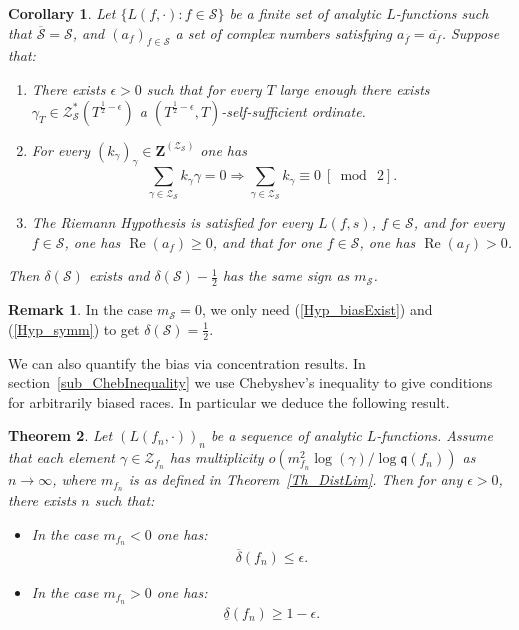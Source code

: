 \documentclass[a4paper,10pt]{amsart}
\theoremstyle{plain}
\newtheorem{theo}{Theorem}[section]
\newtheorem{cor}[theo]{Corollary}
\theoremstyle{definition}
\newtheorem{Rk}{Remark}
\begin{document}
\begin{cor}\label{Cor_mean_bias}
Let $\lbrace L(f,\cdot) : f\in\mathcal{S} \rbrace$ be a finite set of analytic $L$-functions such that $\overline{\mathcal{S}}=\mathcal{S}$, 
and $(a_{f})_{f\in \mathcal{S}}$ a set of complex numbers satisfying $a_{\overline{f}}= \overline{a_{f}}$.
Suppose that:
\begin{enumerate}
\item\label{Hyp_biasExist} There exists $\epsilon>0$ such that for every $T$ large enough there exists $\gamma_{T}\in \mathcal{Z}_{\mathcal{S}}^{*}(T^{\frac{1}{2} - \epsilon})$ a $(T^{\frac{1}{2} - \epsilon},T)$-self-sufficient ordinate.
\item\label{Hyp_symm} For every $(k_{\gamma})_{\gamma} \in \mathbf{Z}^{(\mathcal{Z}_{\mathcal{S}})}$ one has
$$ \sum_{\gamma \in \mathcal{Z}_{\mathcal{S}}}k_{\gamma}\gamma =0 \Rightarrow \sum_{\gamma \in \mathcal{Z}_{\mathcal{S}}}k_{\gamma}\equiv 0\ [\bmod\ 2].$$
\item\label{Hyp_supp} The Riemann Hypothesis is satisfied for every $L(f,s)$, $f\in\mathcal{S}$,
and for every $f\in \mathcal{S}$, one has $\operatorname{Re}(a_{f})\geq 0$, and that for one $f\in\mathcal{S}$, one has $\operatorname{Re}(a_{f})> 0$.
\end{enumerate}
Then $\delta(\mathcal{S})$ exists
and $\delta(\mathcal{S}) - \frac{1}{2}$ has the same sign as $m_{\mathcal{S}}$. 
\end{cor}

\begin{Rk}
In the case $m_{\mathcal{S}}=0$, we only need (\ref{Hyp_biasExist}) and (\ref{Hyp_symm}) to get $\delta(\mathcal{S})=\frac{1}{2}$. 
\end{Rk}

We can also quantify the bias via concentration results.
In section~\ref{sub_ChebInequality} we use Chebyshev's inequality to give conditions for arbitrarily biased races.
In particular we deduce the following result.

\begin{theo}\label{Th_arbitraryBiased}
Let $(L(f_{n},\cdot))_{n}$ be a sequence of analytic $L$-functions.
Assume that each element $\gamma\in\mathcal{Z}_{f_{n}}$ has multiplicity 
$o\left(m_{f_{n}}^{2} \log(\gamma) / \log \mathfrak{q}(f_{n})\right)$ as $n\rightarrow\infty$,
where $m_{f_{n}}$ is as defined in Theorem~\ref{Th_DistLim}.
Then for any $\epsilon >0$, there exists $n$ such that:
	\begin{itemize}
		\item In the case $m_{f_{n}}<0$ one has:
		\begin{align*}
		\overline{\delta}(f_{n}) \leq \epsilon.
		\end{align*}
		\item In the case $m_{f_{n}}>0$ one has:
		\begin{align*}
		\underline{\delta}(f_{n}) \geq 1- \epsilon.
		\end{align*}
	\end{itemize}
\end{theo}
\end{document}
